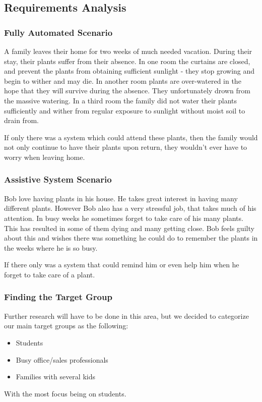 \documentclass{ubicomp2012}
\begin{document}
\subsection{Requirements Analysis}

\subsubsection{Fully Automated Scenario}
A family leaves their home for two weeks of much needed vacation. During their stay, their plants suffer from their absence.
In one room the curtains are closed, and prevent the plants from obtaining sufficient sunlight - they stop growing and begin to wither and may die.
In another room plants are over-watered in the hope that they will survive during the absence. They unfortunately drown from the massive watering.
In a third room the family did not water their plants sufficiently and wither from regular exposure to sunlight without moist soil to drain from.

If only there was a system which could attend these plants, then the family would not only continue to have their plants upon return, they wouldn't ever have to worry when leaving home.

\subsubsection{Assistive System Scenario}
Bob love having plants in his house. He takes great interest in having many different plants. However Bob also has a very stressful job, that takes much of his attention. In busy weeks he sometimes forget to take care of his many plants. This has resulted in some of them dying and many getting close. Bob feels guilty about this and wishes there was something he could do to remember the plants in the weeks where he is so busy.

If there only was a system that could remind him or even help him when he forget to take care of a plant.

\subsubsection{Finding the Target Group}
Further research will have to be done in this area, but we decided to categorize our main target groups as the following:
\begin{itemize}
  \item Students
  \item Busy office/sales professionals 
  \item Families with several kids
\end{itemize}
With the most focus being on students.
\end{document}
